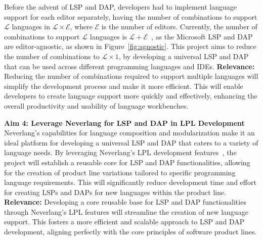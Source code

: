 \hfill \break
Before the advent of LSP and DAP, developers had to implement language support for each editor separately, having the number of combinations to support $\mathcal{L}$ languages in $\mathcal{L} \times \mathcal{E}$, where $\mathcal{E}$ is the number of editors.
Currently, the number of combinations to support $\mathcal{L}$ languages is $\mathcal{L} + \mathcal{E}$~\cite{Rodriguez-Echeverria18a}, as the Microsoft LSP and DAP are editor-agnostic, as shown in Figure~\ref{fig:agnostic}. This project aims to reduce the number of combinations to $\mathcal{L} \times 1$, by developing a universal LSP and DAP that can be used across different programming languages and IDEs.
\hfill \break
\textbf{Relevance:} Reducing the number of combinations required to support multiple languages will simplify the development process and make it more efficient. This will enable developers to create language support more quickly and effectively, enhancing the overall productivity and usability of language workbenches.

\hfill \break
\noindent
\textbf{Aim 4: Leverage Neverlang for LSP and DAP in LPL Development}
\hfill \break
Neverlang's capabilities for language composition and modularization make it an ideal platform for developing a universal LSP and DAP that caters to a variety of language needs. By leveraging Neverlang's LPL development features~\cite{Cazzola20}, the project will establish a reusable core for LSP and DAP functionalities, allowing for the creation of product line variations tailored to specific programming language requirements. This will significantly reduce development time and effort for creating LSPs and DAPs for new languages within the product line.
\hfill \break
\textbf{Relevance:}  Developing a core reusable base for LSP and DAP functionalities through Neverlang's LPL features will streamline the creation of new language support. This fosters a more efficient and scalable approach to LSP and DAP development, aligning perfectly with the core principles of software product lines.


